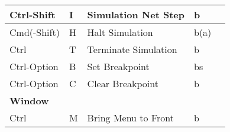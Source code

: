 \begin{longtable}{|l|l|l|l|l|}
Ctrl-Shift   & I   & Simulation Net Step       & b    &                \\ \hline
Cmd(-Shift)  & H   & Halt Simulation           & b(a) &                \\ \hline
Ctrl         & T   & Terminate Simulation      & b    &                \\ \hline
Ctrl-Option  & B   & Set Breakpoint            & bs   &                \\ \hline
Ctrl-Option  & C   & Clear Breakpoint          & b    &                \\ \hline
\multicolumn{5}{|l|}{\textbf{Window}}                                 \\ \hline
Ctrl         & M   & Bring Menu to Front       & b    &                \\ \hline

\end{longtable}

